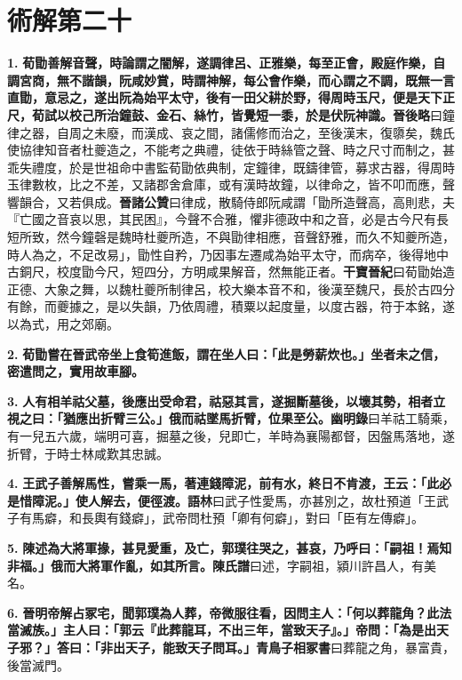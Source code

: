 \chapter{術解第二十}

\textbf{1.} \textbf{荀勖善解音聲，時論謂之闇解，遂調律呂、正雅樂，每至正會，殿庭作樂，自調宮商，無不諧韻，阮咸妙賞，時謂神解，每公會作樂，而心謂之不調，既無一言直勖，意忌之，遂出阮為始平太守，後有一田父耕於野，得周時玉尺，便是天下正尺，荀試以校己所治鐘鼓、金石、絲竹，皆覺短一黍，於是伏阮神識。}{\footnotesize \textbf{晉後略}曰鐘律之器，自周之未廢，而漢成、哀之間，諸儒修而治之，至後漢末，復隳矣，魏氏使協律知音者杜夔造之，不能考之典禮，徒依于時絲管之聲、時之尺寸而制之，甚乖失禮度，於是世祖命中書監荀勖依典制，定鐘律，既鑄律管，募求古器，得周時玉律數枚，比之不差，又諸郡舍倉庫，或有漢時故鐘，以律命之，皆不叩而應，聲響韻合，又若俱成。\textbf{晉諸公贊}曰律成，散騎侍郎阮咸謂「勖所造聲高，高則悲，夫『亡國之音哀以思，其民困』，今聲不合雅，懼非德政中和之音，必是古今尺有長短所致，然今鐘磬是魏時杜夔所造，不與勖律相應，音聲舒雅，而久不知夔所造，時人為之，不足改易」，勖性自矜，乃因事左遷咸為始平太守，而病卒，後得地中古銅尺，校度勖今尺，短四分，方明咸果解音，然無能正者。\textbf{干寶晉紀}曰荀勖始造正德、大象之舞，以魏杜夔所制律呂，校大樂本音不和，後漢至魏尺，長於古四分有餘，而夔據之，是以失韻，乃依周禮，積粟以起度量，以度古器，符于本銘，遂以為式，用之郊廟。}

\textbf{2.} \textbf{荀勖嘗在晉武帝坐上食筍進飯，謂在坐人曰：「此是勞薪炊也。」坐者未之信，密遣問之，實用故車腳。}

\textbf{3.} \textbf{人有相羊祜父墓，後應出受命君，祜惡其言，遂掘斷墓後，以壞其勢，相者立視之曰：「猶應出折臂三公。」俄而祜墜馬折臂，位果至公。}{\footnotesize \textbf{幽明錄}曰羊祜工騎乘，有一兒五六歲，端明可喜，掘墓之後，兒即亡，羊時為襄陽都督，因盤馬落地，遂折臂，于時士林咸歎其忠誠。}

\textbf{4.} \textbf{王武子善解馬性，嘗乘一馬，著連錢障泥，前有水，終日不肯渡，王云：「此必是惜障泥。」使人解去，便徑渡。}{\footnotesize \textbf{語林}曰武子性愛馬，亦甚別之，故杜預道「王武子有馬癖，和長輿有錢癖」，武帝問杜預「卿有何癖」，對曰「臣有左傳癖」。}

\textbf{5.} \textbf{陳述為大將軍掾，甚見愛重，及亡，郭璞往哭之，甚哀，乃呼曰：「嗣祖！焉知非福。」俄而大將軍作亂，如其所言。}{\footnotesize \textbf{陳氏譜}曰述，字嗣祖，潁川許昌人，有美名。}

\textbf{6.} \textbf{晉明帝解占冢宅，聞郭璞為人葬，帝微服往看，因問主人：「何以葬龍角？此法當滅族。」主人曰：「郭云『此葬龍耳，不出三年，當致天子』。」帝問：「為是出天子邪？」答曰：「非出天子，能致天子問耳。」}{\footnotesize \textbf{青鳥子相冢書}曰葬龍之角，暴富貴，後當滅門。}

